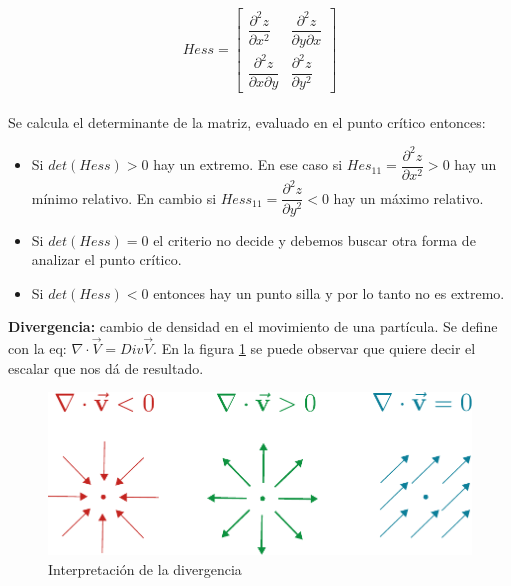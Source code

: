 \documentclass[12pt,a4paper]{article}
\begin{document}
$$
Hess =
\begin{bmatrix}
\dfrac{\partial ^2 z}{\partial x^2 } &  \dfrac{\partial ^2 z}{\partial y \partial x} \\
\dfrac{\partial ^2 z}{\partial x \partial y} & \dfrac{\partial ^2 z}{\partial y^2}
\end{bmatrix}
$$
\\
Se calcula el determinante de la matriz, evaluado en el punto crítico entonces:
\begin{itemize}
\item Si $det(Hess) > 0$ hay un extremo.  En ese caso si $Hes_{11} = \dfrac{\partial ^2 z}{\partial x^2} > 0$ hay un mínimo relativo.  En cambio si $Hess_{11} =  \dfrac{\partial ^2 z}{\partial y^2} < 0$ hay un máximo relativo.

\item Si $det(Hess) = 0$ el criterio no decide y debemos buscar otra forma de analizar el punto crítico.

\item Si $det(Hess) < 0$ entonces hay un punto silla y por lo tanto no es extremo.
\end{itemize}



  \textbf{Divergencia:} cambio de densidad en el movimiento de una partícula. Se define con la eq:
 $ \nabla  \cdot \vec{V} = Div \vec{V}$. En la figura \ref{fig:divergencia} se puede observar que quiere decir el escalar que nos dá de resultado.\\

 \begin{figure}[htbp]
   \begin{center}
       \includegraphics[scale=0.8]{divergencia.pdf}
     \caption{Interpretación de la divergencia}
     \label{fig:divergencia}
   \end{center}
 \end{figure}
\end{document}
